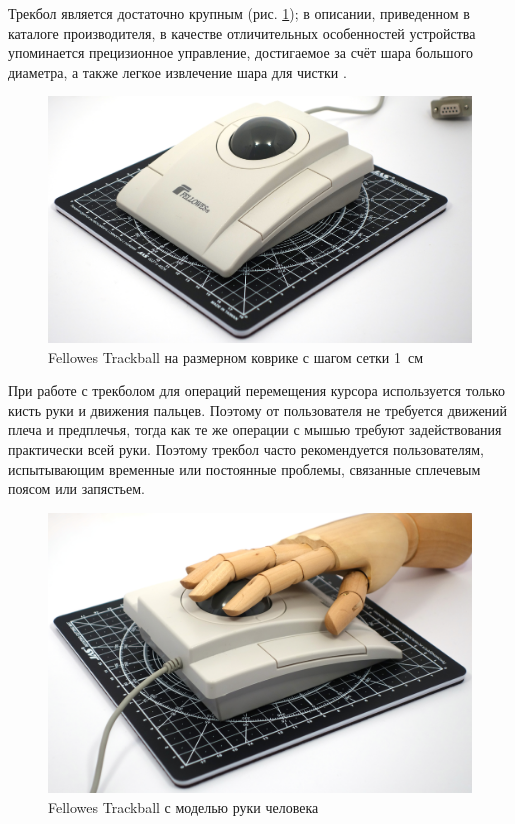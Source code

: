 \documentclass[11pt, a4paper]{article}
\begin{document}
Трекбол является достаточно крупным (рис. \ref{fig:FellowesTrackballSize}); в описании, приведенном в каталоге производителя, в качестве отличительных особенностей устройства упоминается прецизионное управление, достигаемое за счёт шара большого диаметра, а также легкое извлечение шара для чистки \cite{advertising}.

\begin{figure}[h]
    \centering
    \includegraphics[scale=0.3]{1997_fellowes_trackball/size_30.jpg}
    \caption{Fellowes Trackball на размерном коврике с шагом сетки 1~см}
    \label{fig:FellowesTrackballSize}
\end{figure}

При работе с трекболом для операций перемещения курсора используется только кисть руки и движения пальцев. Поэтому от пользователя не требуется движений плеча и предплечья, тогда как те же операции с мышью требуют задействования практически всей руки. Поэтому трекбол часто рекомендуется пользователям, испытывающим временные или постоянные проблемы, связанные сплечевым поясом или запястьем.

\begin{figure}[h]
    \centering
    \includegraphics[scale=0.3]{1997_fellowes_trackball/hand_30.jpg}
    \caption{Fellowes Trackball с моделью руки человека}
    \label{fig:FellowesTrackballHand}
\end{figure}
\end{document}
